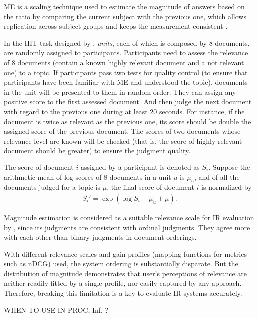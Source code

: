 \documentclass{article}
\begin{document}
ME is a scaling technique used to estimate the magnitude of answers based on the ratio by comparing the current subject with the previous one, which allows replication across subject groups an{}d keeps the measurement consistent \cite{bard1996magnitude}.

In the HIT task designed by \citet{benefits.ME}, \textit{units}, each of which is composed by 8 documents, are randomly assigned to participants. Participants need to assess the relevance of 8 documents (contain a known highly relevant document and a not relevant one) to a topic. If participants pass two tests for quality control (to ensure that participants have been familiar with ME and understood the topic), documents in the unit will be presented to them in random order. They can assign any positive score to the first assessed document. And then judge the next document with regard to the previous one during at least 20 seconds. For instance, if the document is twice as relevant as the previous one, its score should be double the assigned score of the previous document. The scores of two documents whose relevance level are known will be checked (that is, the score of highly relevant document should be greater) to ensure the judgment quality. 

The score of document $i$ assigned by a participant is denoted as $S_i$. Suppose the arithmetic mean of log scores of 8 documents in a unit $u$ is $\mu_u$, and of all the documents judged for a topic is $\mu$, the final score of document $i$ is normalized by
\begin{align}
S_i'=\exp(\log{S_i}-\mu_u+\mu).
\end{align}

Magnitude estimation is considered as a suitable relevance scale for IR evaluation by \citet{benefits.ME}, since its judgments are consistent with ordinal judgments. They agree more with each other than binary judgments in document orderings. 

With different relevance scales and gain profiles (mapping functions for metrics such as nDCG) used, the system ordering is substantially disparate. But the distribution of magnitude demonstrates that user's perceptions of relevance are neither readily fitted by a single profile, nor easily captured by any approach. Therefore, breaking this limitation is a key to evaluate IR systems accurately. 

WHEN TO USE IN PROC, Inf. ?




\end{document}
